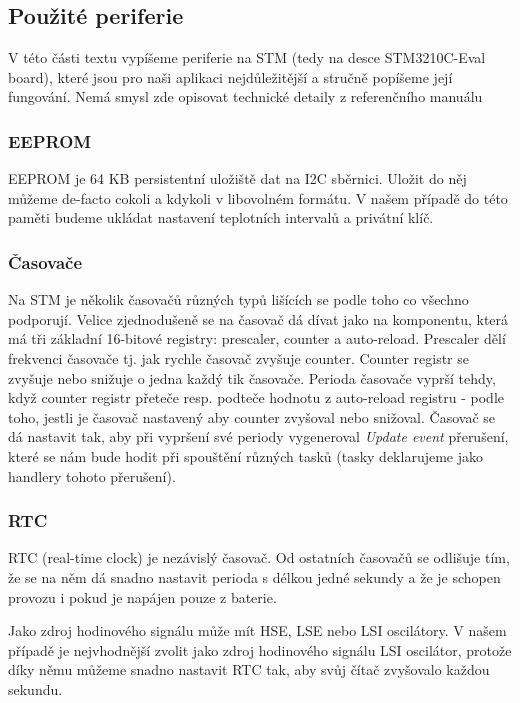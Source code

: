 
\subsection{Použité periferie}
V této části textu vypíšeme periferie na STM (tedy na desce STM3210C-Eval board), které jsou
pro naši aplikaci nejdůležitější a stručně popíšeme její fungování.
Nemá smysl zde opisovat technické detaily z referenčního manuálu \citet{ReferenceManual}

\subsubsection{EEPROM}
EEPROM je 64 KB persistentní uložiště dat na I2C sběrnici.
Uložit do něj můžeme de-facto cokoli a kdykoli v libovolném formátu.
V našem případě do této paměti budeme ukládat nastavení teplotních intervalů a privátní klíč.

\subsubsection{Časovače}
Na STM je několik časovačů různých typů lišících se podle toho co všechno podporují.
Velice zjednodušeně se na časovač dá dívat jako na komponentu, která má tři základní
16-bitové registry: prescaler, counter a auto-reload.
Prescaler dělí frekvenci časovače tj. jak rychle časovač zvyšuje counter.
Counter registr se zvyšuje nebo snižuje o jedna každý tik časovače.
Perioda časovače vyprší tehdy, když counter registr přeteče resp. podteče hodnotu
z auto-reload registru - podle toho, jestli je časovač nastavený aby counter zvyšoval nebo snižoval.
Časovač se dá nastavit tak, aby při vypršení své periody vygeneroval \emph{Update event} přerušení,
které se nám bude hodit při spouštění různých tasků (tasky deklarujeme jako handlery tohoto přerušení).

\subsubsection{RTC}
RTC (real-time clock) je nezávislý časovač.
Od ostatních časovačů se odlišuje tím, že se na něm dá snadno nastavit perioda
s délkou jedné sekundy a že je schopen provozu i pokud je napájen pouze z
baterie.

Jako zdroj hodinového signálu může mít HSE, LSE nebo LSI oscilátory.
V našem případě je nejvhodnější zvolit jako zdroj hodinového signálu LSI oscilátor,
protože díky němu můžeme snadno nastavit RTC tak, aby svůj čítač zvyšovalo
každou sekundu.

